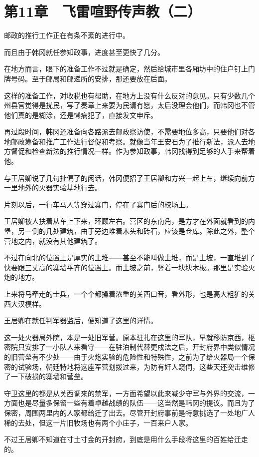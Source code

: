 \section{第11章　飞雷喧野传声教（二）}

邮政的推行工作正在有条不紊的进行中。

而且由于韩冈就任参知政事，进度甚至更快了几分。

在地方而言，眼下的准备工作不过就是确定，然后给城市里各厢坊中的住户钉上门牌号码。至于邮局和邮递所的安排，那还要放在后面。

这样的准备工作，对收税也有帮助，在地方上没有什么反对的意见。只有少数几个州县官觉得是扰民，写了奏章上来要为民请冇愿，太后没理会他们，而韩冈也不管他们真的是糊涂，还是懒病犯了，直接发文申斥。

再过段时间，韩冈还准备向各路派去邮政察访使，不需要地位多高，只要他们对各地邮政筹备和推广工作进行督促和考察。就像当年王安石为了推行新法，派人去地方督促和检查新法的推行情况一样。作为参知政事，韩冈找得到足够的人手来帮着他。

与王居卿说了几句扯偏了的闲话，韩冈便招了王居卿和方兴一起上车，继续向前方一里地外的火器实验基地行去。

片刻以后，一行车马人等穿过寨门，停在了寨门后的校场上。

王居卿被人扶着从车上下来，环顾左右。营区的东南角，是方才在外面就看到的内堡，另一侧的几处建筑，由于旁边堆着木头和砖石，应该是仓库。除此之外，整个营地之内，就没有其他建筑了。

不过在向北的位置上是厚实的土堆——甚至不能叫做土堆，而是土坡，一直堆到了快要跟三丈高的寨墙平齐的位置上。而土坡之前，竖着一块块木板。那里是实验火炮的地方。

上来将马牵走的士兵，一个个都操着浓重的关西口音，看外形，也是高大粗犷的关西大汉模样。

王居卿在就任判军器监后，便知道了这里的详情。

这一处火器局外院，本是一处旧军营。原本驻扎在这里的军队，早就移防京西，枢密院只安排了一小队人来看守——在驻泊制代替更戍法之后，开封府界中类似情况的旧营垒有不少处——由于火炮实验的危险性和特殊性，之前为了给火器局一个保密的试验场，朝廷特地将这座军营划拨过来，为防有奸人窥伺，这些天还突击维修了一下破损的寨墙和营垒。

守卫这里的都是从关西调来的禁军，一方面希望以此来减少守军与外界的交流，一方面也是尽量多保留一些有着卓越战绩的队伍——这当然是韩冈的提议。而且为了保密，周围两里内的人家都给迁了出去。尽管开封府事前是特意挑选了一处地广人稀的去处，但这一片旧牧场也有两个小庄子，一百来户人家。

不过王居卿不知道在寸土寸金的开封府，到底是用什么手段将这里的百姓给迁走的。

